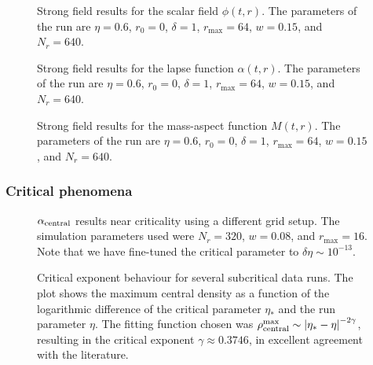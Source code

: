 \documentclass[a4paper,11pt]{article}
\renewcommand{\a}{\alpha}
\renewcommand{\d}{\delta}
\begin{document}
\begin{figure}[H]
  \centering
  
  \caption[Strong field results for the scalar field $\phi(t,r)$.]{Strong field results for the scalar field $\phi(t,r)$. The parameters of the run are $\eta=0.6$, $r_{0}=0$, $\delta=1$, $r_{\max}=64$, $w=0.15$, and $N_{r}=640$.}
  \label{fig:phi_strong}
\end{figure}

\begin{figure}[H]
  \centering
  
  \caption[Strong field results for the lapse function $\a(t,r)$.]{Strong field results for the lapse function $\a(t,r)$. The parameters of the run are $\eta=0.6$, $r_{0}=0$, $\delta=1$, $r_{\max}=64$, $w=0.15$, and $N_{r}=640$.}
  \label{fig:alpha_strong}
\end{figure}

\begin{figure}[H]
  \centering
  
  \caption[Strong field results for the mass-aspect function $M(t,r)$.]{Strong field results for the mass-aspect function $M(t,r)$. The parameters of the run are $\eta=0.6$, $r_{0}=0$, $\delta=1$, $r_{\max}=64$, $w=0.15$, and $N_{r}=640$.}
  \label{fig:mass_strong}
\end{figure}

\subsubsection{Critical phenomena}



\begin{figure}[H]
  \centering
  
  \caption[$\alpha_{\rm central}$ results near criticality using a different grid setup.]{$\alpha_{\rm central}$ results near criticality using a different grid setup. The simulation parameters used were $N_{r}=320$, $w=0.08$, and $r_{\max}=16$. Note that we have fine-tuned the critical parameter to $\d\eta\sim10^{-13}$.}
  \label{fig:critical_alpha_best}
\end{figure}

\begin{figure}[H]
  \centering
  
  \caption[Critical exponent behaviour for subcritical data.]{Critical exponent behaviour for several subcritical data runs. The plot shows the maximum central density as a function of the logarithmic difference of the critical parameter $\eta_{*}$ and the run parameter $\eta$. The fitting function chosen was $\rho^{\rm max}_{\rm central} \sim \left|\eta_{*}-\eta\right|^{-2\gamma}$, resulting in the critical exponent $\gamma\approx0.3746$, in excellent agreement with the literature.}
  \label{fig:critical_alpha_best}
\end{figure}
\end{document}
